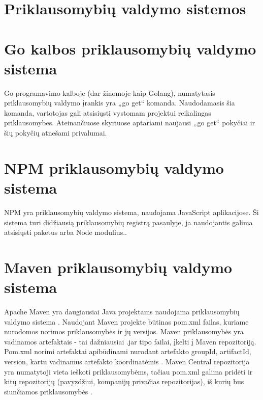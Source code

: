 \section{Priklausomybių valdymo sistemos}







\section{Go kalbos priklausomybių valdymo sistema}

Go programavimo kalboje (dar žinomoje kaip Golang), numatytasis priklausomybių valdymo įrankis yra „go get“
komanda. Naudodamasis šia komanda, vartotojas gali atsisiųsti vystomam projektui reikalingas priklausomybes.
Ateinančiuose skyriuose aptariami naujausi „go get“ pokyčiai ir šių pokyčių atnešami privalumai.







\section{NPM priklausomybių valdymo sistema}

NPM yra priklausomybių valdymo sistema, naudojama JavaScript aplikacijose.
Ši sistema turi didžiausią priklausomybių registrą pasaulyje, ja naudojantis galima atsisiųsti paketus arba Node modulius.\cite{NPMa}.





\section{Maven priklausomybių valdymo sistema}

Apache Maven yra daugiausiai Java projektams naudojama priklausomybių valdymo sistema \cite{MAVENa}.
Naudojant Maven projekte būtinas pom.xml failas, kuriame nurodomos norimos priklausomybės ir jų versijos.
Maven priklausomybės yra vadinamos artefaktais - tai dažniausiai .jar tipo failai, įkelti į Maven repozitoriją.
Pom.xml norimi artefaktai apibūdinami nurodant artefakto groupId, artifactId, version, kartu vadinamus artefakto
koordinatėmis \cite{MAVENb}. Maven Central repozitorija yra numatytoji vieta ieškoti
priklausomybėms, tačiau pom.xml galima pridėti ir kitų repozitorijų (pavyzdžiui,
kompanijų privačias repozitorijas), iš kurių bus siunčiamos priklausomybės \cite{MAVENc}.

